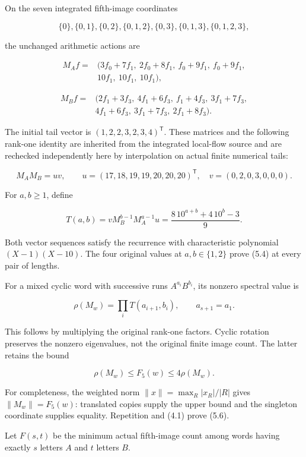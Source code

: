 On the seven integrated fifth-image coordinates

\[
\{0\},\{0,1\},\{0,2\},\{0,1,2\},
\{0,3\},\{0,1,3\},\{0,1,2,3\},
\]

the unchanged arithmetic actions are

\[
\begin{split}
M_Af={}&(3f_0+7f_1,\ 2f_0+8f_1,\ f_0+9f_1,\ f_0+9f_1,\\
&10f_1,\ 10f_1,\ 10f_1),
\end{split}
\]

\[
\begin{split}
M_Bf={}&(2f_1+3f_3,\ 4f_1+6f_3,\ f_1+4f_3,\ 3f_1+7f_3,\\
&4f_1+6f_3,\ 3f_1+7f_3,\ 2f_1+8f_3).
\end{split}
\tag{5.2}
\]

The initial tail vector is \((1,2,2,3,2,3,4)^{\mathsf T}\). These matrices and the following rank-one identity are inherited from the integrated local-flow source and are rechecked independently here by interpolation on actual finite numerical tails:

\[
M_AM_B=uv,\qquad
u=(17,18,19,19,20,20,20)^{\mathsf T},\quad
v=(0,2,0,3,0,0,0).
\tag{5.3}
\]

For \(a,b\ge1\), define

\[
T(a,b)=vM_B^{b-1}M_A^{a-1}u
=\frac{8\,10^{a+b}+4\,10^b-3}{9}.
\tag{5.4}
\]

Both vector sequences satisfy the recurrence with characteristic polynomial \((X-1)(X-10)\). The four original values at \(a,b\in\{1,2\}\) prove (5.4) at every pair of lengths.

For a mixed cyclic word with successive runs \(A^{a_i}B^{b_i}\), its nonzero spectral value is

\[
\rho(M_w)=\prod_i T(a_{i+1},b_i),\qquad a_{s+1}=a_1.
\tag{5.5}
\]

This follows by multiplying the original rank-one factors. Cyclic rotation preserves the nonzero eigenvalues, not the original finite image count. The latter retains the bound

\[
\rho(M_w)\le F_5(w)\le4\rho(M_w).
\tag{5.6}
\]

For completeness, the weighted norm \(\|x\|=\max_R|x_R|/|R|\) gives \(\|M_w\|=F_5(w)\): translated copies supply the upper bound and the singleton coordinate supplies equality. Repetition and (4.1) prove (5.6).

Let \(F(s,t)\) be the minimum actual fifth-image count among words having exactly \(s\) letters \(A\) and \(t\) letters \(B\).


